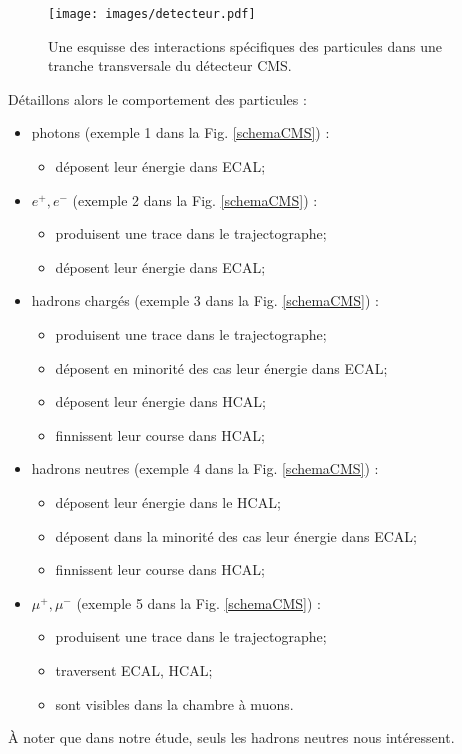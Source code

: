 \documentclass[11pt,a4paper]{article}
\begin{document}
\begin{figure}[!h]
\begin{center}
\texttt{[image: images/detecteur.pdf]}
\caption{Une esquisse des interactions spécifiques des particules dans une tranche transversale du détecteur CMS.}
\label{schemaCMS}
\label{detecteur}
\end{center}
\end{figure}

Détaillons alors le comportement des particules  :
\begin{itemize}
    \item photons (exemple 1 dans la Fig. \ref{schemaCMS}) :
    	\begin{itemize}
		\item déposent leur énergie dans ECAL;
	\end{itemize}
    \item $e^+,e^-$ (exemple 2 dans la Fig. \ref{schemaCMS}) :
        \begin{itemize}
        		\item produisent une trace dans le trajectographe;
		\item déposent leur énergie dans ECAL;
        \end{itemize}
    \item hadrons chargés (exemple 3 dans la Fig. \ref{schemaCMS}) :
        \begin{itemize}
        		\item produisent une trace dans le trajectographe;
    		\item déposent en minorité des cas leur énergie dans ECAL;
    		\item déposent leur énergie dans HCAL;
		\item finnissent leur course dans HCAL;
        \end{itemize}
    \item hadrons neutres (exemple 4 dans la Fig. \ref{schemaCMS}) :
        \begin{itemize}
        		\item déposent leur énergie dans le HCAL;
		\item déposent dans la minorité des cas leur énergie dans ECAL;
		\item finnissent leur course dans HCAL;
        \end{itemize}
    \item $\mu^+,\mu^-$ (exemple 5 dans la Fig. \ref{schemaCMS}) :
        \begin{itemize}
        		\item produisent une trace dans le trajectographe;
		\item traversent ECAL, HCAL;
		\item sont visibles dans la chambre à muons.
        \end{itemize}
\end{itemize}
\`A noter que dans notre étude, seuls les hadrons neutres nous intéressent. \\
\end{document}
